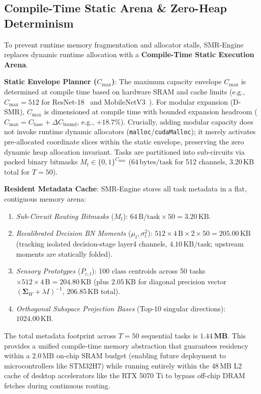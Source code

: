 \documentclass{article}
\begin{document}
\subsection{Compile-Time Static Arena \& Zero-Heap Determinism}
To prevent runtime memory fragmentation and allocator stalls, SMR-Engine replaces dynamic runtime allocation with a \textbf{Compile-Time Static Execution Arena}. 

\noindent\textbf{Static Envelope Planner ($C_{\max}$)}: The maximum capacity envelope $C_{\max}$ is determined at compile time based on hardware SRAM and cache limits (e.g., $C_{\max} = 512$ for ResNet-18~\cite{he2016deep} and MobileNetV3~\cite{howard2019searching}). For modular expansion (D-SMR), $C_{\max}$ is dimensioned at compile time with bounded expansion headroom ($C_{\max} = C_{\mathrm{base}} + \Delta C_{\mathrm{bound}}$, e.g., $+18.7\%$). Crucially, adding modular capacity does not invoke runtime dynamic allocators (\texttt{malloc}/\texttt{cudaMalloc}); it merely activates pre-allocated coordinate slices within the static envelope, preserving the zero dynamic heap allocation invariant. Tasks are partitioned into sub-circuits via packed binary bitmasks $M_t \in \{0, 1\}^{C_{\max}}$ ($64\,\text{bytes/task}$ for 512 channels, $3.20\,\text{KB}$ total for $T=50$).

\noindent\textbf{Resident Metadata Cache}: SMR-Engine stores all task metadata in a flat, contiguous memory arena:
\begin{enumerate}
    \item \textit{Sub-Circuit Routing Bitmasks} ($M_t$): $64\,\text{B/task} \times 50 = 3.20\,\text{KB}$.
    \item \textit{Recalibrated Decision BN Moments} ($\mu_t, \sigma_t^2$): $512 \times 4\,\text{B} \times 2 \times 50 = 205.00\,\text{KB}$ (tracking isolated decision-stage layer4 channels, $4.10\,\text{KB/task}$; upstream moments are statically folded).
    \item \textit{Sensory Prototypes} ($P_{c,t}$): 100 class centroids across 50 tasks $\times 512 \times 4\,\text{B} = 204.80\,\text{KB}$ (plus $2.05\,\text{KB}$ for diagonal precision vector $(\mathbf{\Sigma}_W + \lambda I)^{-1}$, $206.85\,\text{KB}$ total).
    \item \textit{Orthogonal Subspace Projection Bases} (Top-10 singular directions): $1024.00\,\text{KB}$.
\end{enumerate}
The total metadata footprint across $T=50$ sequential tasks is $\mathbf{1.44\,\text{MB}}$. This provides a unified compile-time memory abstraction that guarantees residency within a $2.0\,\text{MB}$ on-chip SRAM budget (enabling future deployment to microcontrollers like STM32H7) while running entirely within the $48\,\text{MB}$ L2 cache of desktop accelerators like the RTX 5070 Ti to bypass off-chip DRAM fetches during continuous routing.
\end{document}
